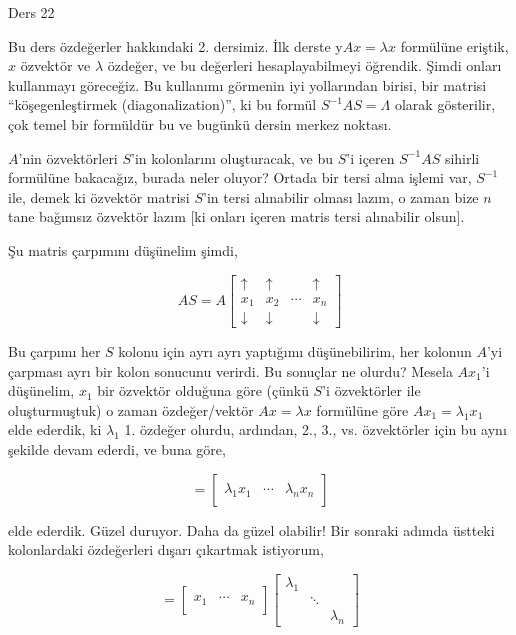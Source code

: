 \documentclass[12pt,fleqn]{article}\usepackage{../../common}
\begin{document}
Ders 22

Bu ders özdeğerler hakkındaki 2. dersimiz. İlk derste y$Ax = \lambda x$
formülüne eriştik, $x$ özvektör ve $\lambda$ özdeğer, ve bu değerleri
hesaplayabilmeyi öğrendik. Şimdi onları kullanmayı göreceğiz. Bu kullanımı
görmenin iyi yollarından birisi, bir matrisi ``köşegenleştirmek
(diagonalization)'', ki bu formül $S^{-1}AS =\Lambda$ olarak gösterilir,
çok temel bir formüldür bu ve bugünkü dersin merkez noktası.

$A$'nin özvektörleri $S$'in kolonlarını oluşturacak, ve bu $S$'i içeren
$S^{-1}AS$ sihirli formülüne bakacağız, burada neler oluyor? Ortada bir
tersi alma işlemi var, $S^{-1}$ ile, demek ki özvektör matrisi $S$'in tersi
alınabilir olması lazım, o zaman bize $n$ tane bağımsız özvektör lazım [ki
onları içeren matris tersi alınabilir olsun].

Şu matris çarpımını düşünelim şimdi, 

$$ 
AS =  
A \left[\begin{array}{rrrr}
\uparrow & \uparrow & & \uparrow \\
x_1 & x_2 & \cdots & x_n \\
\downarrow & \downarrow & & \downarrow
\end{array}\right]
$$

Bu çarpımı her $S$ kolonu için ayrı ayrı yaptığımı düşünebilirim, her
kolonun $A$'yi çarpması ayrı bir kolon sonucunu verirdi. Bu sonuçlar ne
olurdu? Mesela $Ax_1$'i düşünelim, $x_1$ bir özvektör olduğuna göre (çünkü
$S$'i özvektörler ile oluşturmuştuk) o zaman özdeğer/vektör $Ax = \lambda x$ 
formülüne göre $Ax_1 = \lambda_1 x_1$ elde ederdik, ki $\lambda_1$
1. özdeğer olurdu, ardından, 2., 3., vs. özvektörler için bu aynı 
şekilde devam ederdi, ve buna göre,

$$ 
= \left[\begin{array}{rrr}
& &  \\
\lambda_1x_1 & \cdots & \lambda_nx_n \\ 
& & 
\end{array}\right]
 $$

elde ederdik. Güzel duruyor. Daha da güzel olabilir! Bir sonraki adımda üstteki
kolonlardaki özdeğerleri dışarı çıkartmak istiyorum, 

$$ 
= \left[\begin{array}{rrr}
& &  \\
x_1 & \cdots & x_n \\ 
& & 
\end{array}\right]
\left[\begin{array}{rrr}
\lambda_1 & &  \\
& \ddots & \\
& & \lambda_n
\end{array}\right]
 $$
\end{document}
